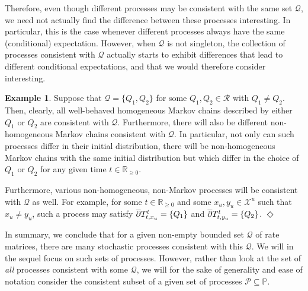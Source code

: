 \documentclass[10pt]{paper}
\theoremstyle{definition}
\newtheorem{exmp}{Example}%
\newcommand{\reals}{\mathbb{R}}
\newcommand{\realsnonneg}{\reals_{\geq 0}}
\newcommand{\states}{\mathcal{X}}
\newcommand{\processes}{\mathbb{P}}
\newcommand{\rateset}{\mathcal{Q}}
\newcommand{\exampleend}{\hfill$\Diamond$}
\begin{document}


Therefore, even though different processes may be consistent with the same set $\rateset$, we need not actually find the difference between these processes interesting. In particular, this is the case whenever different processes always have the same (conditional) expectation. However, when $\rateset$ is not singleton, the collection of processes consistent with $\rateset$ actually starts to exhibit differences that lead to different conditional expectations, and that we would therefore consider interesting.

\begin{exmp}
Suppose that $\rateset=\{Q_1,Q_2\}$ for some $Q_1,Q_2\in\mathcal{R}$ with $Q_1\neq Q_2$. Then, clearly, all well-behaved homogeneous Markov chains described by either $Q_1$ or $Q_2$ are consistent with $\rateset$. Furthermore, there will also be different non-homogeneous Markov chains consistent with $\rateset$. In particular, not only can such processes differ in their initial distribution, there will be non-homogeneous Markov chains with the same initial distribution but which differ in the choice of $Q_1$ or $Q_2$ for any given time $t\in\realsnonneg$. 

Furthermore, various non-homogeneous, non-Markov processes will be consistent with $\rateset$ as well. For example, for some $t\in\realsnonneg$ and some $x_u,y_u\in\states^u$ such that $x_u\neq y_u$, such a process may satisfy $\smash{\overline{\partial}}T_{t,x_u}^t=\{Q_1\}$ and $\smash{\overline{\partial}}T_{t,y_u}^t=\{Q_2\}$.
\exampleend
\end{exmp}

In summary, we conclude that for a given non-empty bounded set $\rateset$ of rate matrices, there are many stochastic processes consistent with this $\rateset$. We will in the sequel focus on such sets of processes. However, rather than look at the set of \emph{all} processes consistent with some $\rateset$, we will for the sake of generality and ease of notation consider the consistent subset of a given set of processes $\mathcal{P}\subseteq\processes$.
\end{document}
